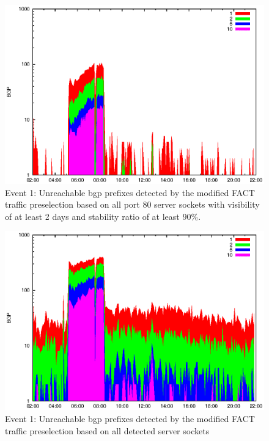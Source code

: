 \begin{figure}
	[p] \centering 
	\includegraphics[width=0.75\linewidth]{images/events/2010_03_25/bgp_log_port80_Set_stab_9_vts_2.eps} \caption{Event 1: Unreachable \gls{bgp} prefixes detected by the modified \gls{FACT} traffic preselection based on all port 80 \glspl{server socket} with visibility of at least 2 days and stability ratio of at least $90\%$.} 
	\label{fig:AMS_IX_FACT_allSES80VTS2STAB9} 
\end{figure}
\begin{figure}
	[p] \centering 
	\includegraphics[width=0.75\linewidth]{images/events/2010_03_25/bgp_log_all_external.eps} \caption{Event 1: Unreachable \gls{bgp} prefixes detected by the modified \gls{FACT} traffic preselection based on all detected \glspl{server socket}} 
	\label{fig:AMS_IX_FACT_allSES} 
\end{figure}
